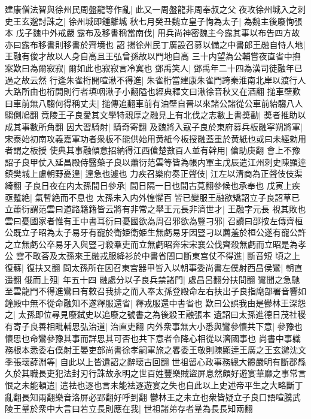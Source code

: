 建康僧法智與徐州民周盤龍等作亂|{
	此又一周盤龍非周奉叔之父}
夜攻徐州城入之刺史王玄邈討誅之|{
	徐州城即鍾離城}
秋七月癸丑魏立皇子恂為太子|{
	為魏主後廢恂張本}
戊子魏中外戒嚴露布及移書稱當南伐|{
	用兵尚神密魏主今露其事以布告四方故亦曰露布移書則移書於齊境也}
詔揚徐州民丁廣設召募以備之中書郎王融自恃人地|{
	王融有俊才故以人身自高且王弘曾孫故以門地自高}
三十内望為公輔嘗夜直省中撫案歎曰為爾寂寂|{
	爾如此也寂寂言冷寞也}
鄧禹笑人|{
	鄧禹年二十四為漢司徒融年已過之故云然}
行逢朱雀桁開喧湫不得進|{
	朱雀桁當建康朱雀門跨秦淮南北岸以渡行人大路所由也桁開則行者填咽湫子小翻隘也經典釋文曰湫徐音秋又在酒翻}
搥車壁歎曰車前無八騶何得稱丈夫|{
	搥傳追翻車前有油壁自晉以來諸公諸從公車前紿騶八人騶側鳩翻}
竟陵王子良愛其文學特親厚之融見上有北伐之志數上書奬勸|{
	奬者推助以成其事數所角翻}
因大習騎射|{
	騎奇寄翻}
及魏將入寇子良於東府募兵板融寜朔將軍|{
	宋泰始初南攻義嘉軍功者衆板不能供始用黄紙今板授融蓋重於黄紙也或曰未經勑用者謂之板授}
使典其事融傾意招納得江西傖楚數百人並有幹用|{
	傖助庚翻}
會上不豫詔子良甲仗入延昌殿侍醫藥子良以蕭衍范雲等皆為帳内軍主戊辰遣江州刺史陳顯逹鎮樊城上慮朝野憂遑|{
	遑急也遽也}
力疾召樂府奏正聲伎|{
	江左以清商為正聲伎伎渠綺翻}
子良日夜在内太孫間日參承|{
	間日隔一日也間古莧翻參候也承奉也}
戊寅上疾亟蹔絶|{
	氣暫絶而不息也}
太孫未入内外惶懼百皆已變服王融欲矯詔立子良詔草已立蕭衍謂范雲曰道路籍籍皆云將有非常之舉王元長非濟世才|{
	王融字元長}
視其敗也雲曰憂國家者惟有王中書耳衍曰憂國欲為周召邪欲為豎刁邪|{
	召讀曰邵按左傳齊桓公既立子昭為太子易牙有寵於衛姫衛姫生無虧易牙因豎刁以薦羞於桓公遂有寵公許之立無虧公卒易牙入與豎刁殺羣吏而立無虧昭奔宋宋襄公伐齊殺無虧而立昭是為孝公}
雲不敢荅及太孫來王融戎服絳衫於中書省閤口斷東宫仗不得進|{
	斷音短}
頃之上復蘇|{
	復扶又翻}
問太孫所在因召東宫器甲皆入以朝事委尚書左僕射西昌侯鸞|{
	朝直遥翻}
俄而上殂|{
	年五十四}
融處分以子良兵禁諸門|{
	處昌呂翻分扶問翻}
鸞聞之急馳至雲龍門不得進鸞曰有敕召我排之而入奉太孫登殿命左右扶出子良指麾部署音響如鐘殿中無不從命融知不遂釋服還省|{
	釋戎服還中書省也}
歎曰公誤我由是鬰林王深怨之|{
	太孫即位尋見廢弑史以追廢之號書之為後殺王融張本}
遺詔曰太孫進德日茂社稷有寄子良善相毗輔思弘治道|{
	治直吏翻}
内外衆事無大小悉與鸞參懷共下意|{
	參豫也懷思也命鸞參豫其事而詳思其可否也共下意者令降心相從以濟國事也}
尚書中事軄務根本悉委右僕射王晏吏部尚書徐孝嗣軍旅之畧委王敬則陳顯逹王廣之王玄邈沈文季張瓌薛淵等|{
	自此以上皆遺詔之辭瓌古回翻}
世祖留心政事務總大體嚴明有斷郡縣久於其職長吏犯法封刃行誅故永明之世百姓豐樂賊盜屏息然頗好遊宴華靡之事常言恨之未能頓遣|{
	遣袪也逐也言未能袪逐遊宴之失也自此以上史述帝平生之大略斷丁亂翻長知兩翻樂音洛屏必郢翻好呼到翻}
鬱林王之未立也衆皆疑立子良口語喧騰武陵王曅於衆中大言曰若立長則應在我|{
	世祖諸弟存者曅為長長知兩翻}
